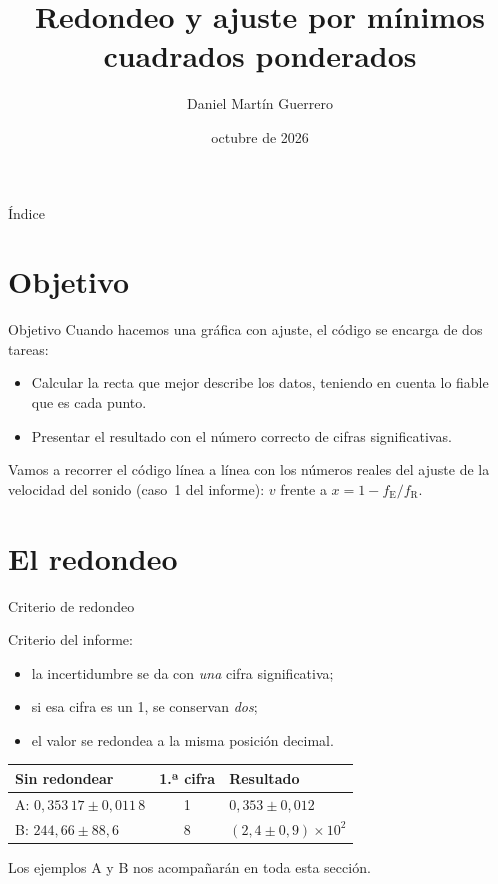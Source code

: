 \documentclass[10pt]{beamer}
\title[Redondeo y ajuste ponderado]{Redondeo y ajuste por mínimos cuadrados ponderados}
\author{Daniel Martín Guerrero}
\institute{Laboratorio de Mecánica y Ondas, Grado en Física\\Universidad de Salamanca}
\date{octubre de 2026}
\newcommand{\resalta}[1]{\textcolor{structure.fg!75!white}{#1}}
\newcommand{\fE}{f_{\mathrm{E}}}
\newcommand{\fR}{f_{\mathrm{R}}}
\begin{document}
\begin{frame}
  \titlepage
\end{frame}

\begin{frame}{Índice}
  \tableofcontents
\end{frame}

\section{Objetivo}
\begin{frame}{Objetivo}
  Cuando hacemos una gráfica con ajuste, el código se encarga de dos tareas:
  \begin{block}{}
    \begin{itemize}
      \item \resalta{Calcular la recta} que mejor describe los datos, teniendo en
        cuenta lo fiable que es cada punto.
      \item \resalta{Presentar el resultado} con el número correcto de cifras
        significativas.
    \end{itemize}
  \end{block}
  Vamos a recorrer el código línea a línea con los números reales del ajuste de
  la velocidad del sonido (caso~1 del informe): $v$ frente a $x=1-\fE/\fR$.
\end{frame}

\section{El redondeo}
\begin{frame}{Criterio de redondeo}
  \begin{block}{}
    \resalta{Criterio del informe:}
    \begin{itemize}
      \item la incertidumbre se da con \emph{una} cifra significativa;
      \item si esa cifra es un 1, se conservan \emph{dos};
      \item el valor se redondea a la misma posición decimal.
    \end{itemize}
  \end{block}
  \centering\small
  \begin{tabular}{@{}lcl@{}}
    \toprule
    Sin redondear & 1.ª cifra & Resultado\\
    \midrule
    A: $0{,}353\,17\pm0{,}011\,8$ & 1 & $0{,}353\pm0{,}012$\\
    B: $244{,}66\pm88{,}6$ & 8 & $(2{,}4\pm0{,}9)\times10^{2}$\\
    \bottomrule
  \end{tabular}
  \par\vspace{4pt}
  \raggedright\small Los ejemplos A y B nos acompañarán en toda esta sección.
\end{frame}
\end{document}

